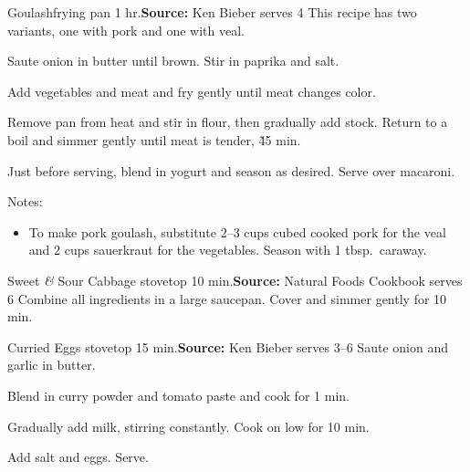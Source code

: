 \begin{recipe}{Goulash}{frying pan \hfill 1 hr.}{\textbf{Source:} Ken Bieber \hfill serves 4}
 \freeform [CB] This recipe has two variants, one with pork and one with veal.

 Saute onion in butter until brown. Stir in paprika and salt.

 Add vegetables and meat and fry gently until meat changes color.

 Remove pan from heat and stir in flour, then gradually add stock. Return to a boil and simmer gently until meat is tender, \~45 min.

 Just before serving, blend in yogurt and season as desired. Serve over macaroni.

 \freeform Notes:
 \begin{itemize}
  \item To make pork goulash, substitute 2--3 cups cubed cooked pork for the veal and 2 cups sauerkraut for the vegetables. Season with 1 tbsp.\ caraway.
 \end{itemize}
\end{recipe}

\begin{recipe}{Sweet \textit{\&} Sour Cabbage}{ \hfill stovetop \hfill 10 min.}{\textbf{Source:} Natural Foods Cookbook \hfill serves 6}
 Combine all ingredients in a large saucepan. Cover and simmer gently for 10 min.
\end{recipe}

\begin{recipe}{Curried Eggs}{ \hfill stovetop \hfill 15 min.}{\textbf{Source:} Ken Bieber \hfill serves 3--6}
 Saute onion and garlic in butter.

 Blend in curry powder and tomato paste and cook for 1 min.

 Gradually add milk, stirring constantly. Cook on low for 10 min.

 Add salt and eggs. Serve.
\end{recipe}

